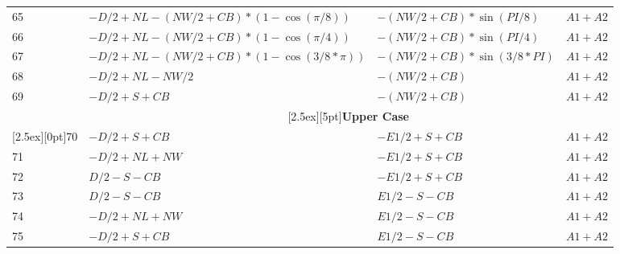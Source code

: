 \documentclass[a4paper, dvipdfm]{article}
\begin{document}
\begin{longtable}{|l|l|l|l|}
65 & $-D/2 + NL - (NW/2 + CB)*(1-\cos(\pi/8))$   & $-(NW/2 + CB)*\sin(PI/8)$   & $A1+A2$\\
66 & $-D/2 + NL - (NW/2 + CB)*(1-\cos(\pi/4))$   & $-(NW/2 + CB)*\sin(PI/4)$   & $A1+A2$\\
67 & $-D/2 + NL - (NW/2 + CB)*(1-\cos(3/8*\pi))$ & $-(NW/2 + CB)*\sin(3/8*PI)$ & $A1+A2$\\
68 & $-D/2 + NL - NW/2$                          & $-(NW/2 + CB)$              & $A1+A2$\\
69 & $-D/2 + S + CB$                             & $-(NW/2 + CB)$              & $A1+A2$\\
\hline
&\multicolumn{3}{|c|}{\raisebox{0pt}[2.5ex][5pt]{\textbf{Upper Case}}}\\\cline{2-4}
\raisebox{0pt}[2.5ex][0pt]{70}
   & $-D/2 + S + CB$  & $-E1/2 + S + CB$ & $A1+A2$\\
71 & $-D/2 + NL + NW$ & $-E1/2 + S + CB$ & $A1+A2$\\
72 & $D/2 - S - CB$   & $-E1/2 + S + CB$ & $A1+A2$\\
73 & $D/2 - S - CB$   & $E1/2 - S - CB$  & $A1+A2$\\
74 & $-D/2 + NL + NW$ & $E1/2 - S - CB$  & $A1+A2$\\
75 & $-D/2 + S + CB$  & $E1/2 - S - CB$  & $A1+A2$\\
\hline
\end{longtable}
\end{document}
